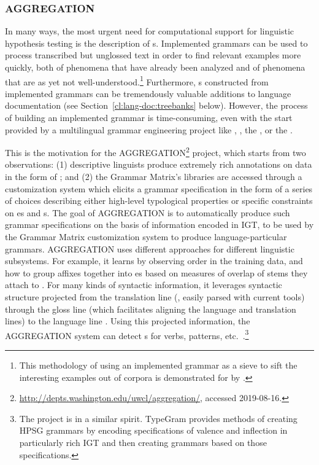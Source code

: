 \documentclass[output=paper
 	        ,biblatex
                ,babelshorthands
                ,newtxmath
                ,draftmode
                ,colorlinks, citecolor=brown
]{langscibook}
\begin{document}
\subsubsection{AGGREGATION}
\label{cl:lang-doc:aggr}

%
In many ways, the most urgent need for computational support for linguistic hypothesis testing is
the description of s. Implemented grammars can be used to process
transcribed but unglossed text in order to find relevant examples more quickly, both of phenomena
that have already been analyzed and of phenomena that are as yet not well-understood.\footnote{This
  methodology of using an implemented grammar as a sieve to sift the interesting examples out of
  corpora is demonstrated for  by \citet{Baldwin-et-al-05}.}  Furthermore,
s constructed from implemented grammars can be tremendously valuable additions to
language documentation (see Section~\ref{cl:lang-doc:treebanks} below). However, the process of
building an implemented grammar is time-consuming, even with the start provided by a multilingual
grammar engineering project like , 
\citep{BDKMR02a-u,Kin:For:Kuh:But:05}, the  \citep{Ranta:09}, or
the .

This is the motivation for the
AGGREGATION\footnote{\url{http://depts.washington.edu/uwcl/aggregation/}, accessed 2019-08-16.}
project, which starts from two observations: (1) descriptive linguists produce extremely rich
annotations on data in the form of ; and (2) the Grammar
Matrix's libraries are accessed through a customization system which elicits a grammar specification
in the form of a series of choices describing either high-level typological
properties or specific constraints on es and s.  The goal of
AGGREGATION is to automatically produce such grammar specifications on the basis of information
encoded in IGT, to be used by the Grammar Matrix customization system to produce language-particular
grammars. AGGREGATION uses different approaches for different linguistic subsystems. For example, it
learns  by observing
 order in the training data, and how to group affixes together into es based on measures of overlap of stems they attach to \citep{Wax:14,Zamaraeva:17}. For
many kinds of syntactic information, it leverages syntactic structure projected from the translation
line (, easily parsed with current tools) through the gloss line (which facilitates
aligning the language and translation lines) to the language line
\citep{Xia:Lew:07,Georgi:16}. Using this projected information, the AGGREGATION system can detect
s for verbs,  patterns, etc.\
\citep{Ben:Goo:Cro:Xia:13,Zam:How:Ben:19}.\footnote{The  project \citep{Hel:Bee:14} is
  in a similar spirit. TypeGram provides methods of creating HPSG grammars by encoding
  specifications of valence and inflection in particularly rich IGT and then creating grammars based
  on those specifications.}%
\end{document}
